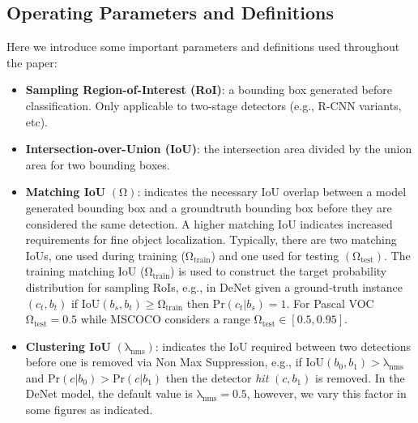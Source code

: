 \documentclass[10pt,twocolumn,letterpaper]{article}
\begin{document}
\subsection{Operating Parameters and Definitions}
Here we introduce some important parameters and definitions used throughout the paper:
\begin{itemize}
\item \textbf{Sampling Region-of-Interest (RoI)}: a bounding box generated before classification. Only applicable to two-stage detectors (e.g., R-CNN variants, etc).
\item \textbf{Intersection-over-Union (IoU)}: the intersection area divided by the union area for two bounding boxes. 
\item \textbf{Matching IoU} $\bm{\mathrm{\left ( \Omega \right )}}$: indicates the necessary IoU overlap between a model generated bounding box and a groundtruth bounding box before they are considered the same detection. A higher matching IoU indicates increased requirements for fine object localization. Typically, there are two matching IoUs, one used during training ($\bm{\mathrm{\Omega_{train}}}$) and one used for testing $\bm{\mathrm{\left ( \Omega_{test} \right )}}$. The training matching IoU ($\bm{\mathrm{\Omega_{train}}}$) is used to construct the target probability distribution for sampling RoIs, e.g., in DeNet given a ground-truth instance $(c_t,b_t)$ if $\mathrm{IoU}(b_s, b_t) \geq \bm{\mathrm{\Omega_{train}}}$ then $\mathrm{Pr}(c_t|b_s) = 1$. For Pascal VOC\cite{pascal-voc} $\bm{\mathrm{\Omega_{test}}}=0.5$ while MSCOCO\cite{mscoco} considers a range $\bm{\mathrm{\Omega_{test}}}\in [0.5,0.95]$. 
\item \textbf{Clustering IoU} $\bm{\mathrm{\left (\lambda_{nms} \right )}}$: indicates the IoU required between two detections before one is removed via Non Max Suppression, e.g., if $\mathrm{IoU}(b_0, b_1) > \bm{\mathrm{\lambda_{nms}}}$ and $\mathrm{Pr}(c|b_0) > \mathrm{Pr}(c|b_1)$ then the detector \textit{hit} $(c,b_1)$ is removed. In the DeNet model, the default value is $\bm{\mathrm{\lambda_{nms}}} = 0.5$, however, we vary this factor in some figures as indicated.
\end{itemize}
\end{document}

